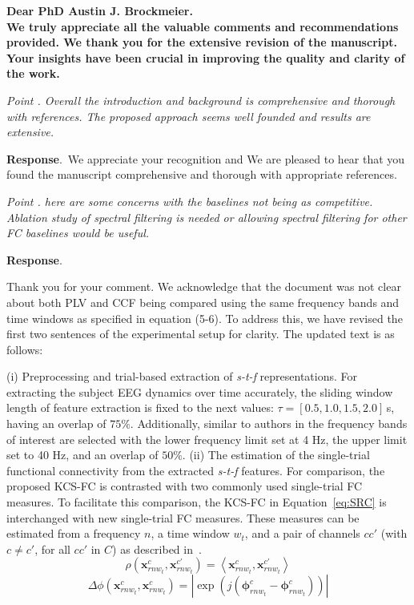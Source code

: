 \documentclass[runningheads]{llncs}
\newcommand{\ve}[1]{\bm {#1}}
\newenvironment{reviewer}{\setcounter{pointcounter}{1}}{}
\newcommand{\changes}[1]{\textcolor[rgb]{1.00,0.00,0.00}{#1}}
\newcommand{\point}[1]{\medskip \noindent
 \textsl{{\fontseries{b}\selectfont Point \thepointcounter}.
 \stepcounter{pointcounter} #1}}
\newcommand{\reply}{\medskip \noindent \textbf{Response}.\ }
\begin{document}
\begin{reviewer}
\textbf{Dear PhD Austin J. Brockmeier.}\\

\textbf{We truly appreciate all the valuable comments and recommendations provided. We thank you for the extensive revision of the manuscript. Your insights have been crucial in improving the quality and clarity of the work.}

\point{Overall the introduction and background is comprehensive and thorough with references. The proposed approach seems well founded and results are extensive.}

\reply{We appreciate your recognition and We are pleased to hear that you found the manuscript comprehensive and thorough with appropriate references.}


\point{here are some concerns with the baselines not being as competitive. Ablation study of spectral filtering is needed or allowing spectral filtering for other FC baselines would be useful.}

\reply{Thank you for your comment. We acknowledge that the document was not clear about both PLV and CCF being compared using the same frequency bands and time windows as specified in equation (5-6). To address this, we have revised the first two sentences of the experimental setup for clarity. The updated text is as follows:

\changes{
({i}) Preprocessing and trial-based extraction of \textit{s-t-f} representations. For extracting the subject EEG dynamics over time accurately, the sliding window length of feature extraction is fixed to the next values: $\tau=[0.5,1.0,1.5,2.0]$\,{s}, having an overlap of $75\%$. Additionally, similar to authors in \cite{ang2008filter} the frequency bands of interest are selected with the lower frequency limit set at 4 Hz, the upper limit set to 40 Hz, and an overlap of $50\%$. \cite{ang2008filter}
}
\changes{
({ii}) The estimation of the single-trial functional connectivity from the extracted \textit{s-t-f} features. For comparison, the proposed KCS-FC is contrasted with two commonly used single-trial FC measures. To facilitate this comparison, the KCS-FC in Equation~\eqref{eq:SRC} is interchanged with new single-trial FC measures. These measures can be estimated from a frequency $n$, a time window $w_t$, and a pair of channels ${cc'}$ (with $c \neq c'$, for all $cc'$ in $C$) as described in~\cite{rodrigue2019}.
\begin{equation}
			\rho(\ve{x}^{c}_{rnw_t},\ve{x}^{c'}_{rnw_t}) ={\left<\ve{x}^{c}_{rnw_t},\ve{x}^{c'}_{rnw_t}\right>}\label{Eq:Pearson}
\end{equation}
\begin{equation}		 
	{\Delta\phi(\ve{x}^{c}_{rnw_t},\ve{x}^{c}_{rnw_t})}  {= {|\exp(j(\ve{\phi}_{rnw_t}^{c}-\ve{\phi}_{rnw_t}^{c}))|}} \label{Eq:PLV} 
\end{equation}
} 
}


\end{reviewer}
\end{document}
